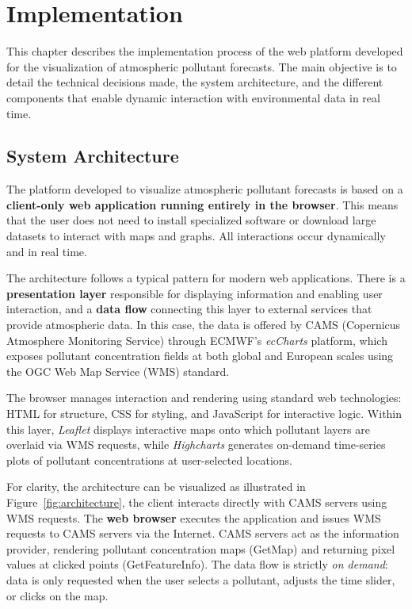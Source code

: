 \chapter[Implementation]{Implementation}
\label{Chap3}

This chapter describes the implementation process of the web platform developed for the visualization of atmospheric pollutant forecasts. The main objective is to detail the technical decisions made, the system architecture, and the different components that enable dynamic interaction with environmental data in real time.

\section{System Architecture}

The platform developed to visualize atmospheric pollutant forecasts is based on a \textbf{client-only web application running entirely in the browser}. This means that the user does not need to install specialized software or download large datasets to interact with maps and graphs. All interactions occur dynamically and in real time.

The architecture follows a typical pattern for modern web applications. There is a \textbf{presentation layer} responsible for displaying information and enabling user interaction, and a \textbf{data flow} connecting this layer to external services that provide atmospheric data. In this case, the data is offered by CAMS (Copernicus Atmosphere Monitoring Service) through ECMWF’s \emph{ecCharts} platform, which exposes pollutant concentration fields at both global and European scales using the OGC Web Map Service (WMS) standard.

The browser manages interaction and rendering using standard web technologies: HTML for structure, CSS for styling, and JavaScript for interactive logic. Within this layer, \emph{Leaflet} displays interactive maps onto which pollutant layers are overlaid via WMS requests, while \emph{Highcharts} generates on-demand time-series plots of pollutant concentrations at user-selected locations.

For clarity, the architecture can be visualized as illustrated in Figure~\ref{fig:architecture}, the client interacts directly with CAMS servers using WMS requests. The \textbf{web browser} executes the application and issues WMS requests to CAMS servers via the Internet. CAMS servers act as the information provider, rendering pollutant concentration maps (GetMap) and returning pixel values at clicked points (GetFeatureInfo). The data flow is strictly \textit{on demand}: data is only requested when the user selects a pollutant, adjusts the time slider, or clicks on the map.



